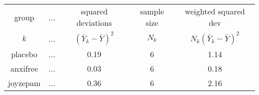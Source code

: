 \small
\vspace*{6pt}
\begin{tabular}{c|c |c|c|c}
 group & \hspace{.25cm}...\hspace{.25cm} & squared deviations & sample size & weighted squared dev\\  
  $k$  & ... & $(\bar{Y}_{k} - \bar{Y})^2$ & $N_k$ & $N_k (\bar{Y}_{k} - \bar{Y})^2$\\  \hline
placebo   & ... &  0.19 & 6 & 1.14\\
anxifree  & ... &  0.03 & 6 & 0.18\\
joyzepam  & ... &  0.36 & 6 & 2.16\\
\end{tabular}
\vspace*{6pt}
\normalsize

